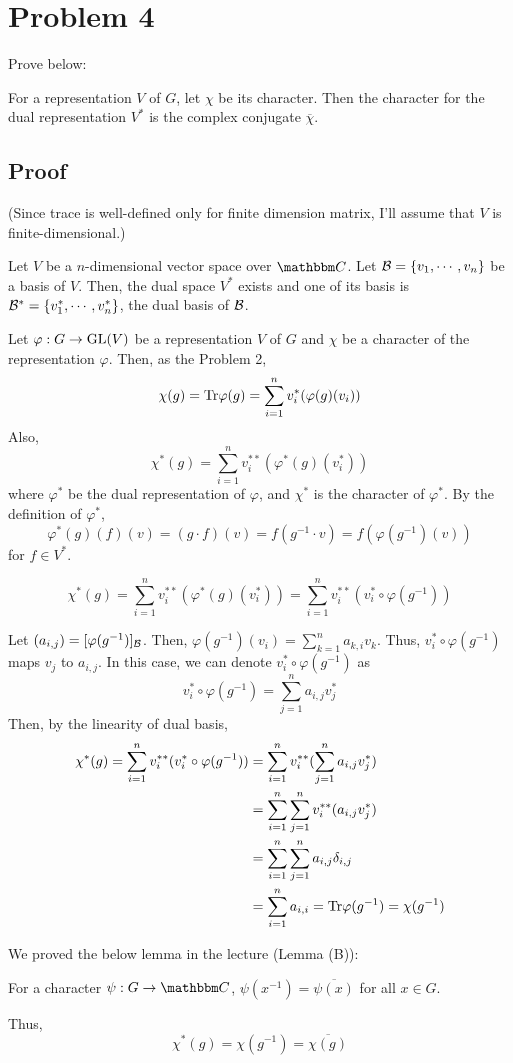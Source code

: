 \section*{Problem 4}

Prove below:
\begin{theorem}
  For a representation \(V\) of \(G\),
  let \(\chi\) be its character.
  Then the character for the dual representation \(V^*\)
  is the complex conjugate \(\overline{\chi}\).
\end{theorem}

\subsection*{Proof}

(Since trace is well-defined only for finite dimension matrix,
I'll assume that \(V\) is finite-dimensional.)

Let \(V\) be a \(n\)-dimensional vector space over \(\bbC\).
Let \(\mathcal{B} = \{v_1, \cdots, v_n\}\) be a basis of \(V\).
Then, the dual space \(V^*\) exists and one of its basis is
\(\mathcal{B}^* = \{v_1^*, \cdots, v_n^*\}\), the dual basis of \(\mathcal{B}\).

Let \(\varphi: G \to \textnormal{GL}(V)\) be a representation \(V\) of \(G\)
and \(\chi\) be a character of the representation \(\varphi\).
Then, as the Problem 2,
\[\chi(g) = \textnormal{Tr} \varphi(g) = \sum_{i=1}^{n} v_i^*(\varphi(g)(v_i))\]
Also,
\[\chi^*(g) = \sum_{i=1}^{n} v_i^{**}(\varphi^*(g)(v_i^*))\]
where \(\varphi^*\) be the dual representation of \(\varphi\),
and \(\chi^*\) is the character of \(\varphi^*\).
By the definition of \(\varphi^*\),
\[\varphi^*(g)(f)(v) = (g \cdot f)(v) = f(g^{-1} \cdot v) = f(\varphi(g^{-1})(v))\]
for \(f \in V^*\).

\[\chi^*(g)
= \sum_{i=1}^{n} v_i^{**}(\varphi^*(g)(v_i^*))
= \sum_{i=1}^{n} v_i^{**}(v_i^* \circ \varphi(g^{-1}))\]

Let \((a_{i,j}) = [\varphi(g^{-1})]_{\mathcal{B}}\).
Then, \(\varphi(g^{-1})(v_i) = \sum_{k=1}^n a_{k, i} v_k\).
Thus, \(v_i^* \circ \varphi(g^{-1})\) maps \(v_j\) to \(a_{i, j}\).
In this case, we can denote \(v_i^* \circ \varphi(g^{-1})\) as
\[v_i^* \circ \varphi(g^{-1}) = \sum_{j=1}^n a_{i, j} v_j^*\]
Then, by the linearity of dual basis,
\begin{align*}
  \chi^*(g)
  = \sum_{i=1}^{n} v_i^{**}(v_i^* \circ \varphi(g^{-1}))
  &= \sum_{i=1}^{n} v_i^{**}(\sum_{j=1}^n a_{i, j} v_j^*)
  \\&= \sum_{i=1}^{n} \sum_{j=1}^n v_i^{**}( a_{i, j} v_j^*)
  \\&= \sum_{i=1}^{n} \sum_{j=1}^n a_{i, j} \delta_{i, j}
  \\&= \sum_{i=1}^{n} a_{i, i} = \textnormal{Tr}\varphi(g^{-1}) = \chi(g^{-1})
\end{align*}

We proved the below lemma in the lecture (Lemma (B)):
\begin{lemma}
  For a character \(\psi: G \to \bbC\),
  \(\psi(x^{-1}) = \overline{\psi(x)}\) for all \(x \in G\).
\end{lemma}

Thus,
\[\chi^*(g) = \chi(g^{-1}) = \overline{\chi(g)}\]
\qedsq